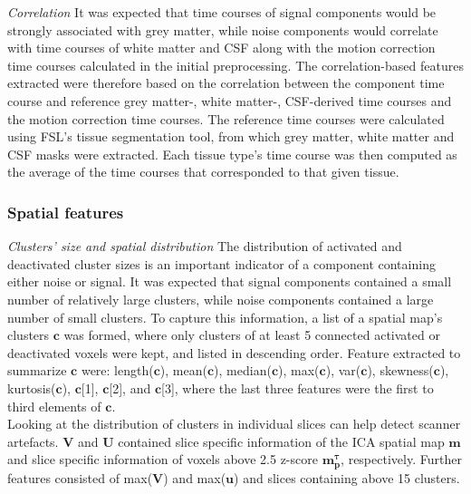 \textit{Correlation} It was expected that time courses of signal components would be strongly associated with grey matter, while noise components would correlate with time courses of white matter and CSF along with the motion correction time courses calculated in the initial preprocessing. The correlation-based features extracted were therefore based on the correlation between the component time course and reference grey matter-, white matter-, CSF-derived time courses and the motion correction time courses. The reference time courses were calculated using FSL’s tissue segmentation tool, from which grey matter, white matter and CSF masks were extracted. Each tissue type's time course was then computed as the average of the time courses that corresponded to that given tissue. \cite{Salimi-Khorshidi2014}

\subsubsection{Spatial features}
\textit{Clusters’ size and spatial distribution} The distribution of activated and deactivated cluster sizes is an important indicator of a component containing either noise or signal. It was expected that signal components contained a small number of relatively large clusters, while noise components contained a large number of small clusters. To capture this information, a list of a spatial map’s clusters $\mathbf{c}$ was formed, where only clusters of at least 5 connected activated or deactivated voxels were kept, and listed in descending order. Feature extracted to summarize $\mathbf{c}$ were: length($\mathbf{c}$), mean($\mathbf{c}$), median($\mathbf{c}$), max($\mathbf{c}$), var($\mathbf{c}$), skewness($\mathbf{c}$), kurtosis($\mathbf{c}$), $\mathbf{c}$[1], $\mathbf{c}$[2], and $\mathbf{c}$[3], where the last three features were the first to third elements of $\mathbf{c}$.\\
Looking at the distribution of clusters in individual slices can help detect scanner artefacts. $\mathbf{V}$ and $\mathbf{U}$ contained slice specific information of the ICA spatial map $\mathbf{m}$ and slice specific information of voxels above 2.5 z-score $\mathbf{m^{\tau}_{p}}$, respectively. Further features consisted of max($\mathbf{V}$) and max($\mathbf{u}$) and slices containing above 15 clusters.\\ %

